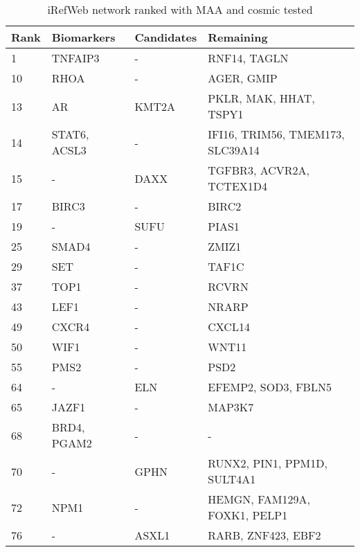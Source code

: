 \begin{table}
    \begin{tabular}{|p{1cm}|p{3cm}|p{3cm}|p{4cm}|}
        \hline
        \textbf{Rank} & \textbf{Biomarkers} & \textbf{Candidates} & \textbf{Remaining} \\
        \hline
        1	& TNFAIP3	& -	& RNF14, TAGLN \\
        \hline
        10	& RHOA	& -	& AGER, GMIP \\
        \hline
        13	& AR	& KMT2A	& PKLR, MAK, HHAT, TSPY1 \\
        \hline
        14	& STAT6, ACSL3	& -	& IFI16, TRIM56, TMEM173, SLC39A14 \\
        \hline
        15	& -	& DAXX	& TGFBR3, ACVR2A, TCTEX1D4 \\
        \hline
        17	& BIRC3	& -	& BIRC2 \\
        \hline
        19	& -	& SUFU	& PIAS1 \\
        \hline
        25	& SMAD4	& -	& ZMIZ1 \\
        \hline
        29	& SET	& -	& TAF1C \\
        \hline
        37	& TOP1	& -	& RCVRN \\
        \hline
        43	& LEF1	& -	& NRARP \\
        \hline
        49	& CXCR4	& -	& CXCL14 \\
        \hline
        50	& WIF1	& -	& WNT11 \\
        \hline
        55	& PMS2	& -	& PSD2 \\
        \hline
        64	& -	& ELN	& EFEMP2, SOD3, FBLN5 \\
        \hline
        65	& JAZF1	& -	& MAP3K7 \\
        \hline
        68	& BRD4, PGAM2	& -	& - \\
        \hline
        70	& -	& GPHN	& RUNX2, PIN1, PPM1D, SULT4A1 \\
        \hline
        72	& NPM1	& -	& HEMGN, FAM129A, FOXK1, PELP1 \\
        \hline
        76	& -	& ASXL1	& RARB, ZNF423, EBF2 \\
        \hline
    \end{tabular}
    \caption{iRefWeb network ranked with MAA and cosmic tested}
    \label{tab:maa-cosmic}
\end{table}

